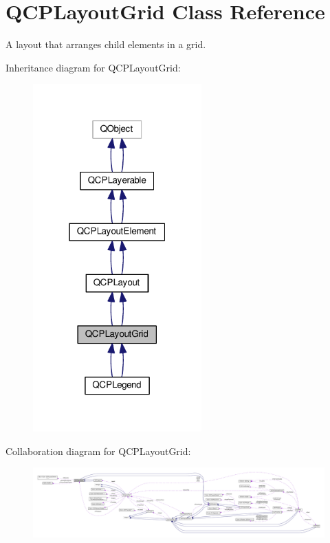 \hypertarget{class_q_c_p_layout_grid}{}\section{Q\+C\+P\+Layout\+Grid Class Reference}
\label{class_q_c_p_layout_grid}


A layout that arranges child elements in a grid.  




Inheritance diagram for Q\+C\+P\+Layout\+Grid\+:\nopagebreak
\begin{figure}[H]
\begin{center}
\leavevmode
\includegraphics[width=184pt]{class_q_c_p_layout_grid__inherit__graph}
\end{center}
\end{figure}


Collaboration diagram for Q\+C\+P\+Layout\+Grid\+:\nopagebreak
\begin{figure}[H]
\begin{center}
\leavevmode
\includegraphics[width=350pt]{class_q_c_p_layout_grid__coll__graph}
\end{center}
\end{figure}

